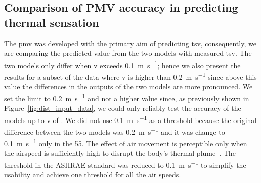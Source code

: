 \subsection{Comparison of PMV accuracy in predicting thermal sensation}\label{subsec:model-accuracy-comparison-in-predicting-thermal-sensation}
The \ac{pmv} was developed with the primary aim of predicting \ac{tsv}, consequently, we are comparing the predicted value from the two models with measured \ac{tsv}.
The two models only differ when \ac{v} exceeds \qty{0.1}{\m\per\s};
hence we also present the results for a subset of the data where \ac{v} is higher than \qty{0.2}{\m\per\s} since above this value the differences in the outputs of the two models are more pronounced.
We set the limit to \qty{0.2}{\m\per\s} and not a higher value since, as previously shown in Figure~\ref{fig:dist_input_data}, we could only reliably test the accuracy of the models up to \ac{v} of .
We did not use \qty{0.1}{\m\per\s} as a threshold because the original difference between the two models was \qty{0.2}{\m\per\s} and it was change to \qty{0.1}{\m\per\s} only in the \gls{55}.
The effect of air movement is perceptible only when the airspeed is sufficiently high to disrupt the body's thermal plume~\cite{zukowska_impact_2012}.
The threshold in the ASHRAE standard was reduced to \qty{0.1}{\m\per\s} to simplify the usability and achieve one threshold for all the air speeds.
